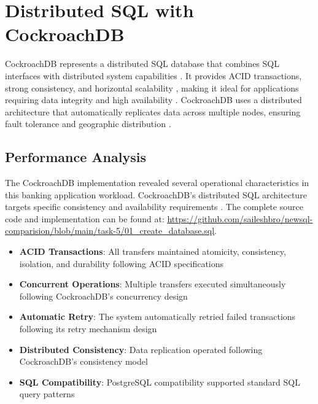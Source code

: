 \chapter{Distributed SQL with CockroachDB}

CockroachDB represents a distributed SQL database that combines SQL interfaces with distributed system capabilities \parencite{cockroachdb_paper}. It provides ACID transactions, strong consistency, and horizontal scalability \parencite{acid_properties}, making it ideal for applications requiring data integrity and high availability \parencite{cockroachdb_docs}. CockroachDB uses a distributed architecture that automatically replicates data across multiple nodes, ensuring fault tolerance and geographic distribution \parencite{cockroachdb_paper}.

\section{Performance Analysis}

The CockroachDB implementation revealed several operational characteristics in this banking application workload. CockroachDB's distributed SQL architecture targets specific consistency and availability requirements \parencite{cockroachdb_paper}. The complete source code and implementation can be found at: \url{https://github.com/saileshbro/newsql-comparision/blob/main/task-5/01_create_database.sql}.

\begin{itemize}
  \item \textbf{ACID Transactions}: All transfers maintained atomicity, consistency, isolation, and durability following ACID specifications \parencite{acid_properties}
  \item \textbf{Concurrent Operations}: Multiple transfers executed simultaneously following CockroachDB's concurrency design \parencite{cockroachdb_docs}
  \item \textbf{Automatic Retry}: The system automatically retried failed transactions following its retry mechanism design \parencite{cockroachdb_paper}
  \item \textbf{Distributed Consistency}: Data replication operated following CockroachDB's consistency model \parencite{cockroachdb_docs}
  \item \textbf{SQL Compatibility}: PostgreSQL compatibility supported standard SQL query patterns \parencite{cockroachdb_paper}
\end{itemize}

